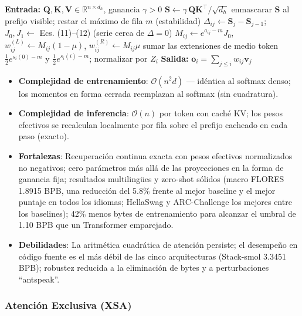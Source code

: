 \begin{algorithmic}[1]
\State \textbf{Entrada:} $\mathbf{Q}, \mathbf{K}, \mathbf{V} \in \mathbb{R}^{n \times d_h}$, ganancia $\gamma>0$
\State $\mathbf{S} \gets \gamma\,\mathbf{Q}\mathbf{K}^\top/\sqrt{d_h}$ 
\State enmascarar $\mathbf{S}$ al prefijo visible; restar el máximo de fila $m$ (estabilidad)
\State $\Delta_{ij} \gets \mathbf{S}_{j}-\mathbf{S}_{j-1}$; \quad $J_0,J_1 \gets$ Ecs. (11)--(12) (serie cerca de $\Delta=0$)
\State $M_{ij} \gets e^{a_{ij}-m}J_0$, \quad $w^{(L)}_{ij}\gets M_{ij}(1-\mu)$, \quad $w^{(R)}_{ij}\gets M_{ij}\mu$
\State sumar las extensiones de medio token $\tfrac12 e^{s_i(0)-m}$ y $\tfrac12 e^{s_i(i)-m}$; normalizar por $Z_i$
\State \textbf{Salida:} $\mathbf{o}_i = \sum_{j\le i} w_{ij}\mathbf{v}_j$ 
\end{algorithmic}

\begin{itemize}[leftmargin=*]
    \item \textbf{Complejidad de entrenamiento}: $\mathcal{O}(n^2 d)$ --- idéntica al softmax denso; los momentos en forma cerrada reemplazan al softmax (sin cuadratura).
    \item \textbf{Complejidad de inferencia}: $\mathcal{O}(n)$ por token con caché KV; los pesos efectivos se recalculan localmente por fila sobre el prefijo cacheado en cada paso (exacto).
    \item \textbf{Fortalezas}: Recuperación continua exacta con pesos efectivos normalizados no negativos; cero parámetros más allá de las proyecciones en la forma de ganancia fija; resultados multilingües y zero-shot sólidos (macro FLORES 1.8915 BPB, una reducción del 5.8\% frente al mejor baseline y el mejor puntaje en todos los idiomas; HellaSwag y ARC-Challenge los mejores entre los baselines); 42\% menos bytes de entrenamiento para alcanzar el umbral de 1.10 BPB que un Transformer emparejado.
    \item \textbf{Debilidades}: La aritmética cuadrática de atención persiste; el desempeño en código fuente es el más débil de las cinco arquitecturas (Stack-smol 3.3451 BPB); robustez reducida a la eliminación de bytes y a perturbaciones ``antspeak''.
\end{itemize}

\subsubsection{Atención Exclusiva (XSA)}

